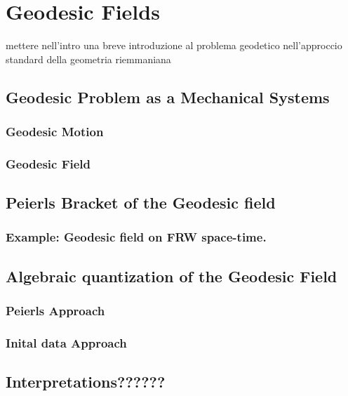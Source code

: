 \documentclass[Main]{subfiles}
\begin{document}
\chapter{Geodesic Fields}
	mettere nell'intro una breve introduzione al problema geodetico nell'approccio standard della geometria riemmaniana

\section{Geodesic Problem as a Mechanical Systems}

\subsection{Geodesic Motion}
\subsection{Geodesic Field}

\section{Peierls Bracket of the Geodesic field}
\subsection{Example: Geodesic field on FRW space-time.}

\section{Algebraic quantization of the Geodesic Field}
\subsection{Peierls Approach}
\subsection{Inital data Approach}

\section{Interpretations??????}
\end{document}
